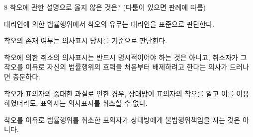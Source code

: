 \begin{question}{8}
착오에 관한 설명으로 옳지 않은 것은? (다툼이 있으면 판례에 따름)
\begin{choices}
  \item 대리인에 의한 법률행위에서 착오의 유무는 대리인을 표준으로 판단한다.
  \item 착오의 존재 여부는 의사표시 당시를 기준으로 판단한다.
  \item 착오에 의한 취소의 의사표시는 반드시 명시적이어야 하는 것은 아니고, 취소자가 그 착오를 이유로 자신의 법률행위의 효력을 처음부터 배제하려고 한다는 의사가 드러나면 충분하다.
  \item 착오가 표의자의 중대한 과실로 인한 경우, 상대방이 표의자의 착오를 알고 이를 이용하였더라도, 표의자는 의사표시를 취소할 수 없다.
  \item 착오를 이유로 법률행위를 취소한 표의자가 상대방에게 불법행위책임을 지는 것은 아니다.
\end{choices}
\end{question}
